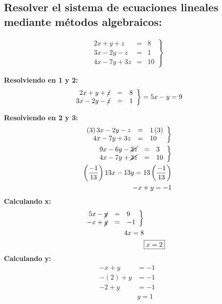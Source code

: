 \documentclass[11pt, a4paper]{article}
\begin{document}
\subsection{Resolver el sistema de ecuaciones lineales mediante métodos algebraicos:}
\vspace{-1cm}
\begin{align*}
  \left.
    \begin{array}{rcl}
      2x+y+z &= &8\\
      3x-2y-z &= &1\\
      4x-7y+3z &= &10
    \end{array}
  \right\}
\end{align*}
\begin{multicols}{2}
  \textbf{Resolviendo en 1 y 2:}
  \begin{align*}
    \left.
      \begin{array}{rcl}
        2x+y+\cancel{z} &= &8\\
      3x-2y-\cancel{z} &= &1
      \end{array}
    \right\} = 5x - y = 9\\
  \end{align*}

  \textbf{Resolviendo en 2 y 3:}
  \begin{align*}
    \left.
      \begin{array}{rcl}
        \left(3\right)3x-2y-z &= &1\left(3\right)\\
        4x-7y+3z &= &10
      \end{array}
    \right\}\\
    \left.
      \begin{array}{rcl}
        9x-6y-\cancel{3z} &= &3\\
        4x-7y+\cancel{3z} &= &10
      \end{array}
    \right\}\\
    \left(\frac{-1}{13}\right)13x-13y = 13\left(\frac{-1}{13}\right)\\
    -x + y = -1
  \end{align*}
  \columnseprule=1pt 
  \textbf{Calculando x:}
  \begin{align*}
    \left.
      \begin{array}{rcl}
        5x - \cancel{y} &= &9\\
        -x + \cancel{y} &= &-1
      \end{array}
    \right\}\\
    4x = 8\\
    &\boxed{x = 2}
  \end{align*}
  \textbf{Calculando y:}
  \begin{align*}
    -x + y &= -1\\
    -\left(2\right) + y &= -1\\
    -2 + y &= -1\\
    &\boxed{y = 1}
  \end{align*}


\end{multicols}
\end{document}
